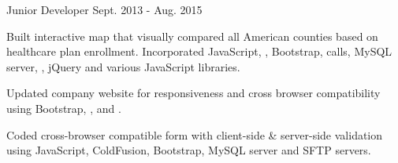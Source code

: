 \begin{cventries}
  \cventry
    {Junior Developer} %
    {} %
    {} %
    {Sept. 2013 - Aug. 2015} %
    {
      \begin{cvitems} %
        \item {Built interactive map that visually compared all American counties based on healthcare plan enrollment. Incorporated JavaScript, , Bootstrap,  calls, MySQL server, , jQuery and various JavaScript libraries.}
        \item {Updated company website for responsiveness and cross browser compatibility using Bootstrap, , and .}
        \item {Coded cross-browser compatible form with client-side \& server-side validation using JavaScript, ColdFusion, Bootstrap, MySQL server and SFTP servers.}
      \end{cvitems}
    }


\end{cventries}
